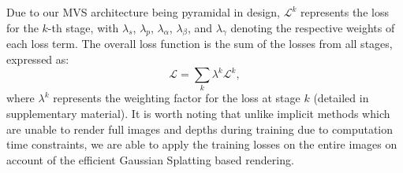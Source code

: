 Due to our MVS architecture being pyramidal in design, $\mathcal{L}^{k}$ represents the loss for the $k$-th stage, with $\lambda_s$, $\lambda_p$, $\lambda_\alpha$, $\lambda_\beta$, and $\lambda_\gamma$ denoting the respective weights of each loss term. The overall loss function is the sum of the losses from all stages, expressed as:
\begin{equation}
\label{eq:overall_loss}
\mathcal{L} = \sum_k \lambda^k \mathcal{L}^k,
\end{equation}
where $\lambda^k$ represents the weighting factor for the loss at stage $k$ (detailed in supplementary material). It is worth noting that unlike implicit methods which are unable to render full images and depths during training due to computation time constraints, we are able to apply the training losses on the entire images on account of the efficient Gaussian Splatting based rendering.
